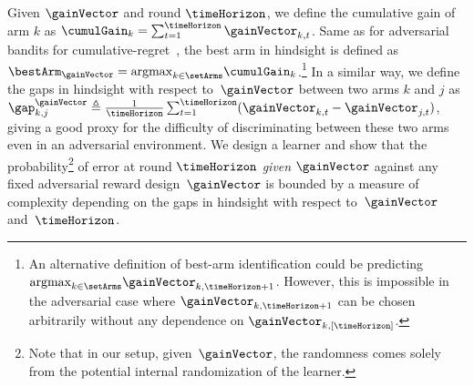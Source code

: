 Given $\gainVector$ and round $\timeHorizon$, we define the
cumulative gain of arm $k$ as
$\cumulGain_k=\sum_{t=1}^{\timeHorizon}\gainVector_{k,t}$.  Same
as for adversarial bandits for cumulative-regret~\citep{Auer02NM}, the best arm in hindsight is defined as
$\bestArm_{\gainVector}= \argmax_{k\in\setArms}
\cumulGain_{k}$.\footnote{An alternative definition of best-arm identification
	could be predicting
	$\argmax_{k\in\setArms}\gainVector_{k,\timeHorizon+1}$. However, this
	is impossible in the adversarial case where
	$\gainVector_{k,\timeHorizon+1}$ can be chosen arbitrarily without
	any dependence on $\gainVector_{k,[\timeHorizon]}$.}
In a similar way, we define the gaps in hindsight with respect to~$\gainVector$ between two arms $k$ and 
$j$ as $\gap^\gainVector_{k,j}\triangleq\frac{1}{\timeHorizon}
\sum_{t=1}^{\timeHorizon}(\gainVector_{k,t}-\gainVector_{j,t})$, 
giving a good proxy for the difficulty of discriminating between
these two arms even in an adversarial environment. 
We design a learner and show that the probability\footnote{Note that in our setup, 
	given~$\gainVector$, the randomness comes solely from the potential 
	internal randomization of the learner.} of error at round $\timeHorizon$ \emph{given} $\gainVector$ 
	against 
any fixed adversarial reward design~$\gainVector$
	is 
bounded by a measure of complexity depending on the 
gaps in hindsight with respect to~$\gainVector$ and~$\timeHorizon$. 

